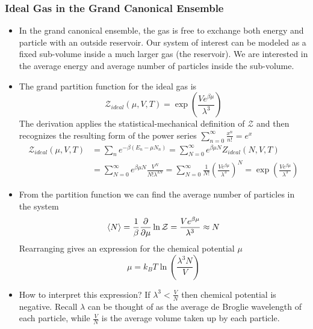 \documentclass[11pt, a4paper]{article}
\begin{document}
\subsubsection{Ideal Gas in the Grand Canonical Ensemble}
\begin{itemize}
	\item In the grand canonical ensemble, the gas is free to exchange both energy and particle with an outside reservoir. Our system of interest can be modeled as a fixed sub-volume inside a much larger gas (the reservoir). We are interested in the average energy and average number of particles inside the sub-volume.
	
	\item The grand partition function for the ideal gas is 
	\begin{equation*}
		\mathcal{Z}_{ideal}(\mu, V, T)  = \exp(\frac{V e^{\beta \mu}}{\lambda^{3}})
	\end{equation*}
	The derivation applies the statistical-mechanical definition of $ \mathcal{Z} $ and then recognizes the resulting form of the power series $ \sum_{n = 0}^{\infty}\frac{x^{n}}{n!} = e^{x} $
	\begin{align*}
		\mathcal{Z}_{ideal}(\mu, V, T) &= \sum_{n} e^{-\beta(E_{n} - \mu N_{n})} = \sum_{N=0}^{\infty}e^{\beta \mu N}Z_{ideal}(N, V, T) \\
		&=   \sum_{N = 0}^{\infty} e^{\beta \mu N} \frac{V^{N}}{N!\lambda^{3N}} = \sum_{N = 0}^{\infty} \frac{1}{N!}\left(\frac{V e^{\beta \mu}}{\lambda^{3}}\right)^{N} = \exp(\frac{V e^{\beta \mu}}{\lambda^{3}})
	\end{align*}
	
	\item From the partition function we can find the average number of particles in the system
	\begin{equation*}
		\expval{N} = \frac{1}{\beta}\pdv{}{\mu}\ln \mathcal{Z} = \frac{Ve^{\beta \mu}}{\lambda^{3}} \approx N 
	\end{equation*}
	Rearranging gives an expression for the chemical potential $ \mu $
	\begin{equation*}
		\mu = k_{B}T \ln(\frac{\lambda^{3}N}{V})
	\end{equation*}
	
	
	\item How to interpret this expression? If $ \lambda^{3} < \frac{V}{N}$ then chemical potential is negative. Recall $ \lambda $ can be thought of as the average de Broglie wavelength of each particle, while $ \frac{V}{N} $ is the average volume taken up by each particle. 
	

\end{itemize}
\end{document}
